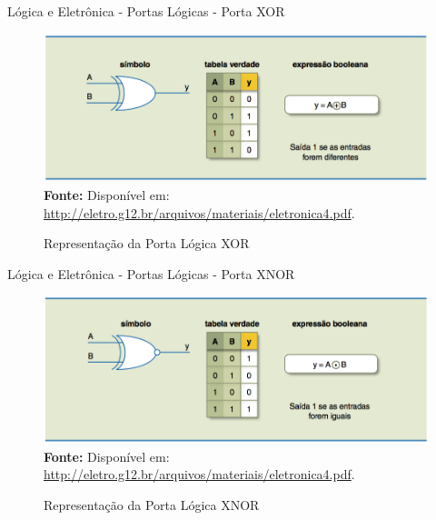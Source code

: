 \documentclass[aspectratio=169]{beamer}
\begin{document}
	\begin{frame}{Lógica e Eletrônica - Portas Lógicas - Porta XOR}
		\begin{figure}[h]
			\centering
			\caption{Representação da Porta Lógica XOR}
			\includegraphics[height=0.66\textheight]{img/ed/ed-porta_xor.png}
			\\
			{\footnotesize \textbf{Fonte:} Disponível em: \url{http://eletro.g12.br/arquivos/materiais/eletronica4.pdf}.}
			\label{fig:ed-porta_XOR}
		\end{figure}
	\end{frame}
	
	\begin{frame}{Lógica e Eletrônica - Portas Lógicas - Porta XNOR}
		\begin{figure}[h]
			\centering
			\caption{Representação da Porta Lógica XNOR}
			\includegraphics[height=0.66\textheight]{img/ed/ed-porta_xnor.png}
			\\
			{\footnotesize \textbf{Fonte:} Disponível em: \url{http://eletro.g12.br/arquivos/materiais/eletronica4.pdf}.}
			\label{fig:ed-porta_XNOR}
		\end{figure}
	\end{frame}
	
\end{document}
